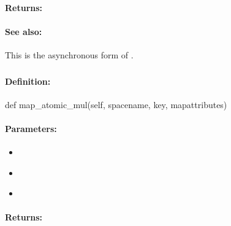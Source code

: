 \paragraph{Returns:}


\paragraph{See also:}  This is the asynchronous form of .

\pagebreak
\subsubsection{}
\label{api:python:map_atomic_mul}


\paragraph{Definition:}
\begin{pythoncode}
def map_atomic_mul(self, spacename, key, mapattributes)
\end{pythoncode}

\paragraph{Parameters:}
\begin{itemize}[noitemsep]
\item {}\\

\item {}\\

\item {}\\

\end{itemize}

\paragraph{Returns:}


\pagebreak
\subsubsection{}
\label{api:python:async_map_atomic_mul}


